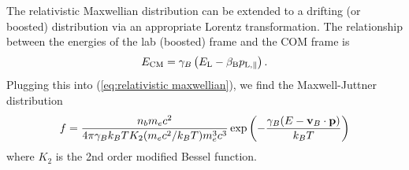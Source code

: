 \documentclass[usenatbib,iop,apj]{emulateapj}
\newcommand\bmath[1] {\mbox{\boldmath$\rm #1$}}
\newcommand{\vel}{\ensuremath{\bmath{v}}}
\newcommand{\betaBOOST}{\ensuremath{\beta_{\rm B}}}
\begin{document}
The relativistic Maxwellian distribution can be extended to a drifting (or boosted) distribution via an appropriate Lorentz transformation.  The relationship between the energies of the lab (boosted) frame and the COM frame is
\begin{equation}
  E_{\rm CM} = \gamma_B\left(E_{\rm L} - \betaBOOST p_{\rm L,\parallel}\right).
\end{equation}
Plugging this into (\ref{eq:relativistic maxwellian}), we find the Maxwell-Juttner distribution \citep{1911AnP...340..145J,1975PhRvA..12..686W}
\begin{eqnarray}\label{eq:distribution function beam} %
f = \frac{n_b m_e c^2}{4\pi\gamma_B k_B T K_2(m_ec^2/k_B T )m_e^3c^3} \exp\left(-\frac {\gamma_B(E - \vel_B\cdot \bmath{p})} {k_B T}\right)
\end{eqnarray}
where $K_2$ is the 2nd order modified Bessel function. 

\end{document}
